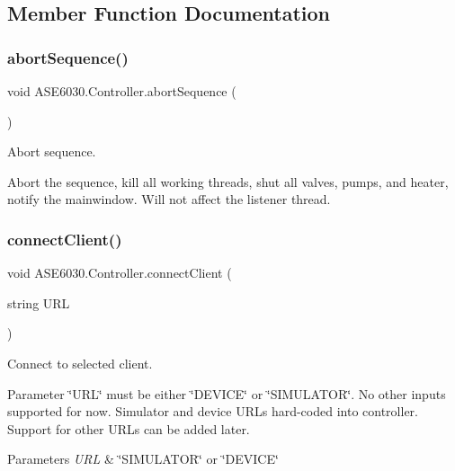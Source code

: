 \subsection{Member Function Documentation}
\mbox{\label{class_a_s_e6030_1_1_controller_a1fa113ab02226c2d8a678365a749e3b0}} 
\subsubsection{\texorpdfstring{abort\+Sequence()}{abortSequence()}}
{\footnotesize\ttfamily void A\+S\+E6030.\+Controller.\+abort\+Sequence (\begin{DoxyParamCaption}{ }\end{DoxyParamCaption})\hspace{0.3cm}{\ttfamily [inline]}}



Abort sequence. 

Abort the sequence, kill all working threads, shut all valves, pumps, and heater, notify the mainwindow. Will not affect the listener thread. \mbox{\label{class_a_s_e6030_1_1_controller_a5f84e69b4885c561df4bc177fcc54d40}} 
\subsubsection{\texorpdfstring{connect\+Client()}{connectClient()}}
{\footnotesize\ttfamily void A\+S\+E6030.\+Controller.\+connect\+Client (\begin{DoxyParamCaption}\item[{string}]{U\+RL }\end{DoxyParamCaption})\hspace{0.3cm}{\ttfamily [inline]}}



Connect to selected client. 

Parameter \char`\"{}\+U\+R\+L\char`\"{} must be either \char`\"{}\+D\+E\+V\+I\+C\+E\char`\"{} or \char`\"{}\+S\+I\+M\+U\+L\+A\+T\+O\+R\char`\"{}. No other inputs supported for now. Simulator and device U\+R\+Ls hard-\/coded into controller. Support for other U\+R\+Ls can be added later. 
\begin{DoxyParams}{Parameters}
{\em U\+RL} & \char`\"{}\+S\+I\+M\+U\+L\+A\+T\+O\+R\char`\"{} or \char`\"{}\+D\+E\+V\+I\+C\+E\char`\"{}\\
\hline
\end{DoxyParams}
\mbox{\label{class_a_s_e6030_1_1_controller_afee09ba01da47aa772ce3da642e08e47}} 
